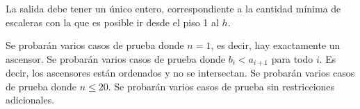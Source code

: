 \documentclass{oci}
\begin{document}
\begin{outputDescription}
  La salida debe tener un único entero, correspondiente a la
  cantidad mínima de escaleras con la que es posible ir desde
  el piso 1 al $h$.
\end{outputDescription}

\newpage
\begin{scoreDescription}
   Se probarán varios casos de prueba donde $n = 1$, es decir, hay exactamente un
  ascensor.
   Se probarán varios casos de prueba donde $b_i < a_{i+1}$ para todo $i$.
  Es decir, los ascensores están ordenados y no se intersectan.
   Se probarán varios casos de prueba donde $n \leq 20$.
   Se probarán varios casos de prueba sin restricciones adicionales.
\end{scoreDescription}

\begin{sampleDescription}
\end{sampleDescription}
\end{document}
